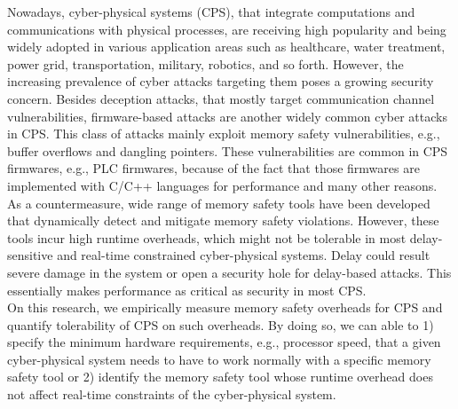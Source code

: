 Nowadays, cyber-physical systems (CPS), that integrate computations and communications with physical processes, are receiving high popularity and being widely adopted in various application areas such as healthcare, water treatment, power grid, transportation, military, robotics, and so forth.
However, the increasing prevalence of cyber attacks targeting them poses a growing security concern. Besides deception attacks, that mostly target communication channel vulnerabilities, firmware-based attacks are another widely common cyber attacks in CPS. This class of attacks mainly exploit memory safety vulnerabilities, e.g., buffer overflows and dangling pointers. These vulnerabilities are common in CPS firmwares, e.g., PLC firmwares, because of the fact that those firmwares are implemented with C/C++ languages for performance and many other reasons.\\ %



As a countermeasure, wide range of memory safety tools have been developed that dynamically detect and mitigate memory safety violations. However, these tools incur high runtime overheads, which might not be tolerable in most delay-sensitive and real-time constrained cyber-physical systems. Delay could result severe damage in the system or open a security hole for delay-based attacks. This essentially makes performance as critical as security in most CPS. \\ 

On this research, we empirically measure memory safety overheads for CPS and quantify tolerability of CPS on such overheads. By doing so, we can able to 1) specify the minimum hardware requirements, e.g., processor speed, that a given cyber-physical system needs to have to work normally with a specific memory safety tool or 2) identify the memory safety tool whose runtime overhead does not affect real-time constraints of the cyber-physical system. 
